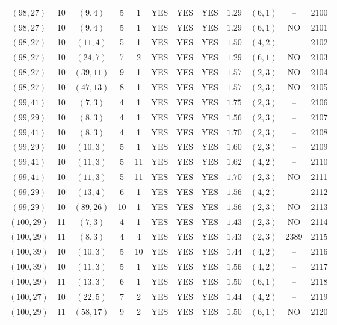 \begin{longtable}{|c|c|c|c|c|c|c|c|c|c|c|c|}
$(98,27)$ & 10 & $(9,4)$ & 5 & 1 & YES & YES & YES & $1.29$ & $(6,1)$ & -- & 2100\\
$(98,27)$ & 10 & $(9,4)$ & 5 & 1 & YES & YES & YES & $1.29$ & $(6,1)$ & NO & 2101\\
$(98,27)$ & 10 & $(11,4)$ & 5 & 1 & YES & YES & YES & $1.50$ & $(4,2)$ & -- & 2102\\
$(98,27)$ & 10 & $(24,7)$ & 7 & 2 & YES & YES & YES & $1.29$ & $(6,1)$ & NO & 2103\\
$(98,27)$ & 10 & $(39,11)$ & 9 & 1 & YES & YES & YES & $1.57$ & $(2,3)$ & NO & 2104\\
$(98,27)$ & 10 & $(47,13)$ & 8 & 1 & YES & YES & YES & $1.57$ & $(2,3)$ & NO & 2105\\
$(99,41)$ & 10 & $(7,3)$ & 4 & 1 & YES & YES & YES & $1.75$ & $(2,3)$ & -- & 2106\\
$(99,29)$ & 10 & $(8,3)$ & 4 & 1 & YES & YES & YES & $1.56$ & $(2,3)$ & -- & 2107\\
$(99,41)$ & 10 & $(8,3)$ & 4 & 1 & YES & YES & YES & $1.70$ & $(2,3)$ & -- & 2108\\
$(99,29)$ & 10 & $(10,3)$ & 5 & 1 & YES & YES & YES & $1.60$ & $(2,3)$ & -- & 2109\\
$(99,41)$ & 10 & $(11,3)$ & 5 & 11 & YES & YES & YES & $1.62$ & $(4,2)$ & -- & 2110\\
$(99,41)$ & 10 & $(11,3)$ & 5 & 11 & YES & YES & YES & $1.70$ & $(2,3)$ & NO & 2111\\
$(99,29)$ & 10 & $(13,4)$ & 6 & 1 & YES & YES & YES & $1.56$ & $(4,2)$ & -- & 2112\\
$(99,29)$ & 10 & $(89,26)$ & 10 & 1 & YES & YES & YES & $1.56$ & $(2,3)$ & NO & 2113\\
$(100,29)$ & 11 & $(7,3)$ & 4 & 1 & YES & YES & YES & $1.43$ & $(2,3)$ & NO & 2114\\
$(100,29)$ & 11 & $(8,3)$ & 4 & 4 & YES & YES & YES & $1.43$ & $(2,3)$ & 2389 & 2115\\
$(100,39)$ & 10 & $(10,3)$ & 5 & 10 & YES & YES & YES & $1.44$ & $(4,2)$ & -- & 2116\\
$(100,39)$ & 10 & $(11,3)$ & 5 & 1 & YES & YES & YES & $1.56$ & $(4,2)$ & -- & 2117\\
$(100,29)$ & 11 & $(13,3)$ & 6 & 1 & YES & YES & YES & $1.50$ & $(6,1)$ & -- & 2118\\
$(100,27)$ & 10 & $(22,5)$ & 7 & 2 & YES & YES & YES & $1.44$ & $(4,2)$ & -- & 2119\\
$(100,29)$ & 11 & $(58,17)$ & 9 & 2 & YES & YES & YES & $1.50$ & $(6,1)$ & NO & 2120\\

\end{longtable}
